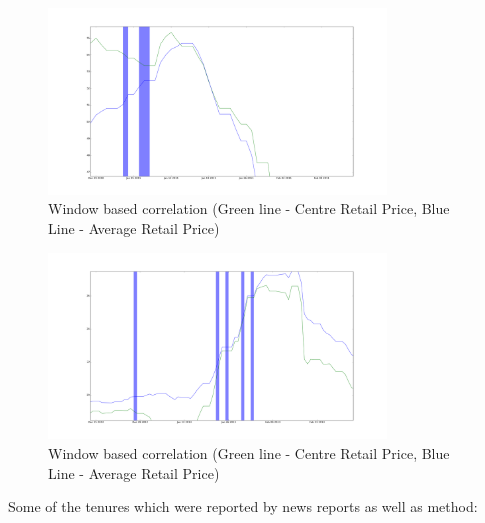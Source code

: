 \documentclass[a4paper,10pt]{report}
\begin{document}
\begin{itemize}
			\begin{figure}[H]
		    	\centering
  		    	\includegraphics[width=0.8\textwidth]{graphs/20110106_0108.png}
		    	\caption{Window based correlation (Green line - Centre Retail Price, Blue Line - Average Retail Price)}
		    	\label{fig:20110106_0108}
			\end{figure}

			\begin{figure}[H]
		    	\centering
  		    	\includegraphics[width=0.8\textwidth]{graphs/20121227_0105.png}
		    	\caption{Window based correlation (Green line - Centre Retail Price, Blue Line - Average Retail Price)}
		    	\label{fig:20121227_0105}
			\end{figure}
			
			Some of the tenures which were reported by news reports as well as method:
			

\end{itemize}
\end{document}
